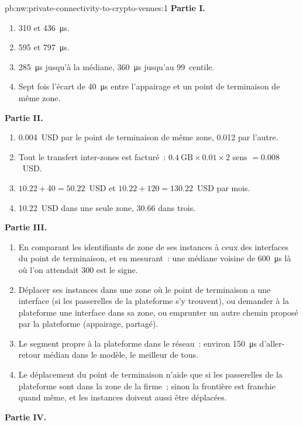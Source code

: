 \begin{solution}{pb:nw:private-connectivity-to-crypto-venues:1}
\textbf{Partie I.}
\begin{enumerate}
\item 310 et \qty{436}{\micro\second}.
\item 595 et \qty{797}{\micro\second}.
\item \qty{285}{\micro\second} jusqu'à la médiane, \qty{360}{\micro\second} jusqu'au 99~centile.
\item Sept fois l'écart de \qty{40}{\micro\second} entre l'appairage et un point de terminaison de même zone.
\end{enumerate}
\textbf{Partie II.}
\begin{enumerate}[resume]
\item 0.004~USD par le point de terminaison de même zone, 0.012 par l'autre.
\item Tout le transfert inter-zones est facturé~: $0.4~\mathrm{GB} \times 0.01 \times 2$ sens $= 0.008$~USD.
\item $10.22 + 40 = 50.22$~USD et $10.22 + 120 = 130.22$~USD par mois.
\item 10.22~USD dans une seule zone, 30.66 dans trois.
\end{enumerate}
\textbf{Partie III.}
\begin{enumerate}[resume]
\item En comparant les identifiants de zone de ses instances à ceux des interfaces du point de terminaison, et en mesurant~: une médiane voisine de \qty{600}{\micro\second}
  là où l'on attendait 300 est le signe.
\item Déplacer ses instances dans une zone où le point de terminaison a une interface (si les passerelles de la plateforme s'y trouvent), ou demander à la plateforme une interface dans
  sa zone, ou emprunter un autre chemin proposé par la plateforme (appairage,  partagé).
\item Le segment propre à la plateforme dans le réseau~: environ \qty{150}{\micro\second} d'aller-retour médian dans le modèle, le meilleur de tous.
\item Le déplacement du point de terminaison n'aide que si les passerelles de la plateforme sont dans la zone de la firme~; sinon la frontière est franchie quand même, et les instances
  doivent aussi être déplacées.
\end{enumerate}
\textbf{Partie IV.}
\begin{enumerate}[resume]

\end{enumerate}
\end{solution}

